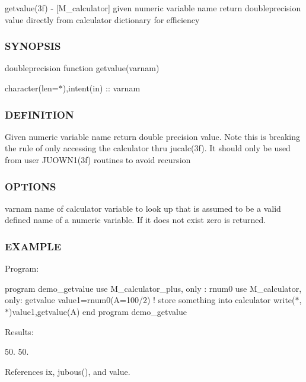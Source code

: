 getvalue(3f) -\/ \mbox{[}M\+\_\+calculator\mbox{]} given numeric variable name return doubleprecision value directly from calculator dictionary for efficiency \subsubsection*{S\+Y\+N\+O\+P\+S\+IS}

doubleprecision function getvalue(varnam)

character(len=$\ast$),intent(in) \+:\+: varnam

\subsubsection*{D\+E\+F\+I\+N\+I\+T\+I\+ON}

Given numeric variable name return double precision value. Note this is breaking the rule of only accessing the calculator thru jucalc(3f). It should only be used from user J\+U\+O\+W\+N1(3f) routines to avoid recursion \subsubsection*{O\+P\+T\+I\+O\+NS}

varnam name of calculator variable to look up that is assumed to be a valid defined name of a numeric variable. If it does not exist zero is returned. \subsubsection*{E\+X\+A\+M\+P\+LE}

Program\+:

program demo\+\_\+getvalue use M\+\_\+calculator\+\_\+plus, only \+: rnum0 use M\+\_\+calculator, only\+: getvalue value1=rnum0(\textquotesingle{}A=100/2\textquotesingle{}) ! store something into calculator write($\ast$,$\ast$)value1,getvalue(\textquotesingle{}A\textquotesingle{}) end program demo\+\_\+getvalue

Results\+:

50. 50. 

References ix, jubous(), and value.

\mbox{\label{namespacem__calculator_a28e87f9e58861836dd6f7dec4bbb9311}} 

